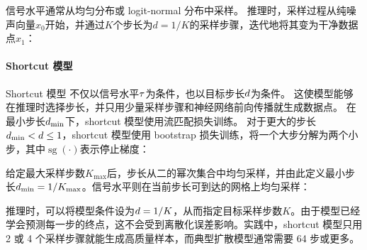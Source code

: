 \documentclass[11pt]{article}
\begin{document}
信号水平通常从均匀分布或 logit-normal 分布中采样\citep{sd3}。
推理时，采样过程从纯噪声向量$x_0$开始，并通过$K$个步长为$d = 1/K$的采样步骤，迭代地将其变为干净数据点$x_1$：


\paragraph{Shortcut 模型}

Shortcut 模型\citep{shortcut} 不仅以信号水平$\tau$为条件，也以目标步长$d$为条件。
这使模型能够在推理时选择步长，并只用少量采样步骤和神经网络前向传播就生成数据点。
在最小步长$d_\mathrm{min}$下，shortcut 模型使用流匹配损失训练。
对于更大的步长$d_\mathrm{min}<d \leq 1$，shortcut 模型使用 bootstrap 损失训练，将一个大步分解为两个小步，其中$\operatorname{sg}(\cdot)$表示停止梯度：


给定最大采样步数$K_\mathrm{max}$后，步长从二的幂次集合中均匀采样，并由此定义最小步长$d_\mathrm{min}=1/K_\mathrm{max}$。信号水平则在当前步长可到达的网格上均匀采样：


推理时，可以将模型条件设为$d=1/K$，从而指定目标采样步数$K$。由于模型已经学会预测每一步的终点，这不会受到离散化误差影响。实践中，shortcut 模型只用 2 或 4 个采样步骤就能生成高质量样本，而典型扩散模型通常需要 64 步或更多。
\end{document}
